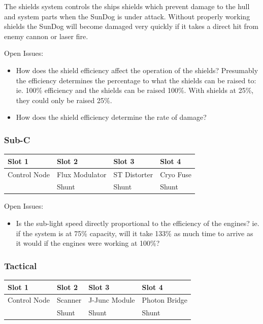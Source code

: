 \begin{itemize}
The shields system controls the ships shields which prevent damage to
the hull and system parts when the SunDog is under attack.  Without
properly working shields the SunDog will become damaged very quickly
if it takes a direct hit from enemy cannon or laser fire.

Open Issues:
\begin{itemize}
\item How does the shield efficiency affect the operation of the shields?
Presumably the efficiency determines the percentage to what the shields can
be raised to:  ie. 100\% efficiency and the shields can be raised 100\%.
With shields at 25\%, they could only be raised 25\%.
\item How does the shield efficiency determine the rate of damage?
\end{itemize}

\subsubsection{Sub-C}

\begin{tabular}{ | p{2.5cm} | p{2.5cm} | p{2.5cm} | p{2.5cm} | }
\hline
Slot 1 & Slot 2 & Slot 3 & Slot 4 \\ \hline
Control Node & Flux Modulator & ST Distorter & Cryo Fuse\\
& Shunt & Shunt & Shunt \\
\hline
\end{tabular}

Open Issues:
\begin{itemize}
\item Is the sub-light speed directly proportional to the efficiency
of the engines?  ie. if the system is at 75\% capacity, will it take
133\% as much time to arrive as it would if the engines were working at
100\%?
\end{itemize}

\subsubsection{Tactical}

\begin{tabular}{ | p{2.5cm} | p{2.5cm} | p{2.5cm} | p{2.5cm} | }
\hline
Slot 1 & Slot 2 & Slot 3 & Slot 4 \\ \hline
Control Node & Scanner & J-Junc Module & Photon Bridge \\
& Shunt & Shunt & Shunt \\
\hline
\end{tabular}


\end{itemize}
